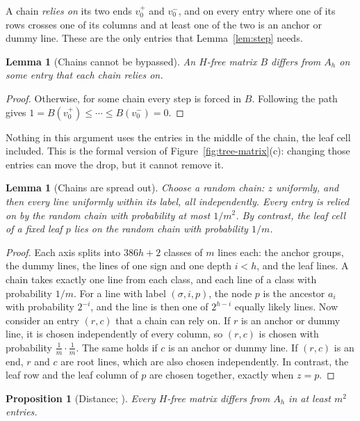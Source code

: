 \documentclass{article}
\theoremstyle{plain}
\newtheorem{lemma}[theorem]{Lemma}
\newtheorem{proposition}[theorem]{Proposition}
\theoremstyle{definition}
\begin{document}
A chain \emph{relies on} its two ends $v_0^+$ and $v_0^-$, and on every entry
where one of its rows crosses one of its columns and at least one of the two is
an anchor or dummy line. These are the only entries that
Lemma~\ref{lem:step} needs.

\begin{lemma}[Chains cannot be bypassed]\label{lem:bypass}
An $H$-free matrix $B$ differs from $A_h$ on some entry that each chain relies
on.
\end{lemma}

\begin{proof}
Otherwise, for some chain every step is forced in $B$. Following the path
gives $1=B(v_0^+)\le\cdots\le B(v_0^-)=0$.
\end{proof}

Nothing in this argument uses the entries in the middle of the chain, the
leaf cell included. This is the formal version of
Figure~\ref{fig:tree-matrix}(c): changing those entries can move the drop, but
it cannot remove it.

\begin{lemma}[Chains are spread out]\label{lem:spread}
Choose a random chain: $z$ uniformly, and then every line uniformly within its
label, all independently. Every entry is relied on by the random chain with
probability at most $1/m^2$. By contrast, the leaf cell of a fixed leaf $p$ lies
on the random chain with probability $1/m$.
\end{lemma}

\begin{proof}
Each axis splits into $386h+2$ classes of $m$ lines each: the anchor groups, the
dummy lines, the lines of one sign and one depth $i<h$, and the leaf lines. A
chain takes exactly one line from each class, and each line of a class with
probability $1/m$. For a line with label $(\sigma,i,p)$, the node $p$ is the
ancestor $a_i$ with probability $2^{-i}$, and the line is then one of $2^{h-i}$
equally likely lines. Now consider an entry $(r,c)$ that a chain can rely on.
If $r$ is an anchor or dummy line, it is chosen independently of every column,
so $(r,c)$ is chosen with probability $\frac1m\cdot\frac1m$. The same holds if
$c$ is an anchor or dummy line. If $(r,c)$ is an end, $r$ and $c$ are root
lines, which are also chosen independently. In contrast, the leaf row and the
leaf column of $p$ are chosen together, exactly when $z=p$.
\end{proof}

\begin{proposition}[Distance; {\cite[Proposition~3.1]{openai}}]\label{prop:distance}
Every $H$-free matrix differs from $A_h$ in at least $m^2$ entries.
\end{proposition}
\end{document}
